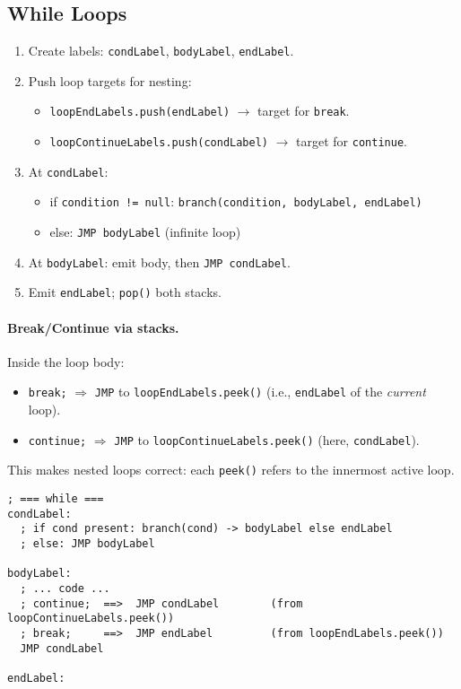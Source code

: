 \documentclass[12pt,a4paper]{report}
\begin{document}
\subsection{While Loops}
\begin{enumerate}
  \item Create labels: \texttt{condLabel}, \texttt{bodyLabel}, \texttt{endLabel}.
  \item Push loop targets for nesting:
    \begin{itemize}
      \item \texttt{loopEndLabels.push(endLabel)} \(\rightarrow\) target for \texttt{break}.
      \item \texttt{loopContinueLabels.push(condLabel)} \(\rightarrow\) target for \texttt{continue}.
    \end{itemize}
  \item At \texttt{condLabel}: 
    \begin{itemize}
      \item if \texttt{condition != null}: \texttt{branch(condition, bodyLabel, endLabel)}
      \item else: \texttt{JMP bodyLabel} (infinite loop)
    \end{itemize}
  \item At \texttt{bodyLabel}: emit body, then \texttt{JMP condLabel}.
  \item Emit \texttt{endLabel}; \texttt{pop()} both stacks.
\end{enumerate}

\paragraph{Break/Continue via stacks.}
Inside the loop body:
\begin{itemize}
  \item \texttt{break;} \(\Rightarrow\) \texttt{JMP} to \texttt{loopEndLabels.peek()} (i.e., \texttt{endLabel} of the \emph{current} loop).
  \item \texttt{continue;} \(\Rightarrow\) \texttt{JMP} to \texttt{loopContinueLabels.peek()} (here, \texttt{condLabel}).
\end{itemize}
This makes nested loops correct: each \texttt{peek()} refers to the innermost active loop.

\begin{lstlisting}[language=SAYACasm, style=code]
; === while ===
condLabel:
  ; if cond present: branch(cond) -> bodyLabel else endLabel
  ; else: JMP bodyLabel

bodyLabel:
  ; ... code ...
  ; continue;  ==>  JMP condLabel        (from loopContinueLabels.peek())
  ; break;     ==>  JMP endLabel         (from loopEndLabels.peek())
  JMP condLabel

endLabel:
\end{lstlisting}
\end{document}
